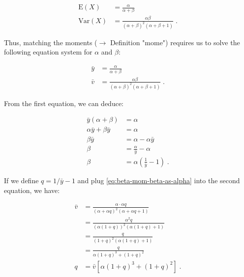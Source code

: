 \documentclass[a4paper,12pt,twoside]{book}
\begin{document}
\begin{equation} \label{eq:beta-mom-Beta-E-Var}
\begin{split}
\mathrm{E}(X) &= \frac{\alpha}{\alpha+\beta} \\
\mathrm{Var}(X) &= \frac{\alpha\beta}{(\alpha+\beta)^2 (\alpha+\beta+1)} \; .
\end{split}
\end{equation}

Thus, matching the moments ($\rightarrow$ Definition "mome") requires us to solve the following equation system for $\alpha$ and $\beta$:

\begin{equation} \label{eq:beta-mom-Beta-mean-var}
\begin{split}
\bar{y} &= \frac{\alpha}{\alpha+\beta} \\
\bar{v} &= \frac{\alpha\beta}{(\alpha+\beta)^2 (\alpha+\beta+1)} \; .
\end{split}
\end{equation}

From the first equation, we can deduce:

\begin{equation} \label{eq:beta-mom-beta-as-alpha}
\begin{split}
\bar{y}(\alpha+\beta) &= \alpha \\
\alpha \bar{y} + \beta \bar{y} &= \alpha \\
\beta \bar{y} &= \alpha - \alpha \bar{y} \\
\beta &= \frac{\alpha}{\bar{y}} - \alpha \\
\beta &= \alpha \left( \frac{1}{\bar{y}} - 1 \right) \; .
\end{split}
\end{equation}

If we define $q = 1/\bar{y} - 1$ and plug \eqref{eq:beta-mom-beta-as-alpha} into the second equation, we have:

\begin{equation} \label{eq:beta-mom-alpha-as-q}
\begin{split}
\bar{v} &= \frac{\alpha \cdot \alpha q}{(\alpha + \alpha q)^2 (\alpha + \alpha q + 1)} \\
&= \frac{\alpha^2 q}{(\alpha (1+q))^2 (\alpha (1+q) + 1)} \\
&= \frac{q}{(1+q)^2 (\alpha (1+q) + 1)} \\
&= \frac{q}{\alpha (1+q)^3 + (1+q)^2} \\
q &= \bar{v} \left[ \alpha (1+q)^3 + (1+q)^2 \right] \; .
\end{split}
\end{equation}
\end{document}

